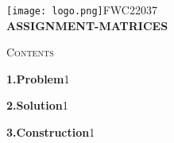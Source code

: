 \documentclass[a4paper,10pt]{report}
\begin{document}
\raggedright{\texttt{[image: logo.png]}}\hspace{12.425cm}\raggedleft FWC22037\vspace{2mm}
\\
\centering\Large\textbf{ASSIGNMENT-MATRICES}\vspace{5mm}


\begin{multicols}{2}
\centering \large\textsc{C}\footnotesize\textsc{ontents}\vspace{5mm}
\\
\raggedright\large\textbf{1.\hspace{1cm}Problem}\hspace{3cm}1\vspace{5mm}\\
\raggedright\large\textbf{2.\hspace{1cm}Solution}\hspace{3.1cm}1\vspace{5mm}\\
\raggedright\large\textbf{3.\hspace{1cm}Construction}\hspace{2.1cm}1\vspace{5mm}\\



\end{multicols}
\end{document}
